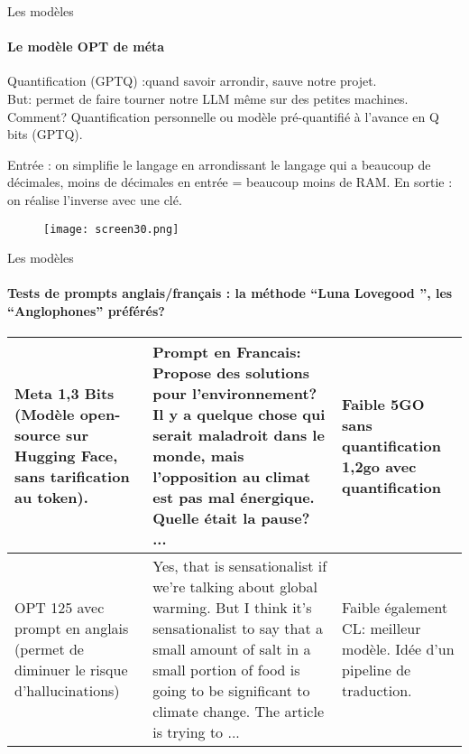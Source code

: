 \documentclass{beamer}
\begin{document}
\begin{frame}{Les modèles}
\framesubtitle{Le modèle OPT de méta}

Quantification (GPTQ) :quand savoir arrondir, sauve notre projet. \\

But: permet de faire tourner notre LLM même sur des petites machines.\\

Comment? Quantification personnelle ou modèle pré-quantifié à l’avance en Q bits (GPTQ).\newline

Entrée : on simplifie le langage en arrondissant le langage qui a beaucoup de décimales, moins de décimales en entrée = beaucoup moins de RAM. 
En sortie : on réalise l’inverse avec une clé. 

\begin{figure}
    \centering
    \texttt{[image: screen30.png]}
    \label{fig:enter-label}
\end{figure}
    
\end{frame}

\begin{frame}{Les modèles}
\framesubtitle{Tests de prompts anglais/français : la méthode “Luna Lovegood ”, les “Anglophones” préférés?}


\begin{tabularx}{\linewidth}{|X|X|X|}
\hline
\small Meta 1,3 Bits (Modèle open-source sur Hugging Face, sans tarification au token).  & 
\tiny Prompt  en Francais: Propose des solutions pour l'environnement? Il y a quelque chose qui serait maladroit dans le monde, mais l'opposition au climat est pas mal énergique.   Quelle était la pause? ... & 
\small Faible 5GO sans quantification 1,2go avec quantification \\ 
\hline
\small OPT 125 avec prompt en anglais (permet de diminuer le risque d'hallucinations) & \tiny Yes, that is sensationalist if we're talking about global warming.  But I think it's sensationalist to say that a small amount of salt in a small portion of food is going to be significant to climate change.  The article is trying to ... & \small Faible également
CL: meilleur modèle. Idée d’un pipeline de traduction.
 \\
\hline
\end{tabularx}
    
\end{frame}
\end{document}
